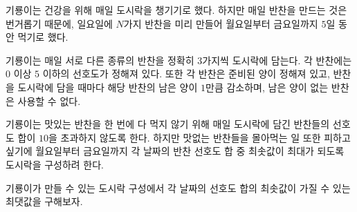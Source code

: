 
기룡이는 건강을 위해 매일 도시락을 챙기기로 했다. 하지만 매일 반찬을 만드는 것은 번거롭기 때문에, 
일요일에 $N$가지 반찬을 미리 만들어 월요일부터 금요일까지 $5$일 동안 먹기로 했다.

기룡이는 매일 서로 다른 종류의 반찬을 정확히 $3$가지씩 도시락에 담는다. 
각 반찬에는 $0$ 이상 $5$ 이하의 선호도가 정해져 있다. 
또한 각 반찬은 준비된 양이 정해져 있고, 
반찬을 도시락에 담을 때마다 해당 반찬의 남은 양이 $1$만큼 감소하며, 
남은 양이 없는 반찬은 사용할 수 없다.

기룡이는 맛있는 반찬을 한 번에 다 먹지 않기 위해 매일 도시락에 담긴 반찬들의 선호도 합이 $10$을 초과하지 않도록 한다.
하지만 맛없는 반찬들을 몰아먹는 일 또한 피하고 싶기에 월요일부터 금요일까지 각 날짜의 반찬 선호도 합 중 최솟값이 최대가 되도록 도시락을 구성하려 한다. 

기룡이가 만들 수 있는 도시락 구성에서 각 날짜의 선호도 합의 최솟값이 가질 수 있는 최댓값을 구해보자.